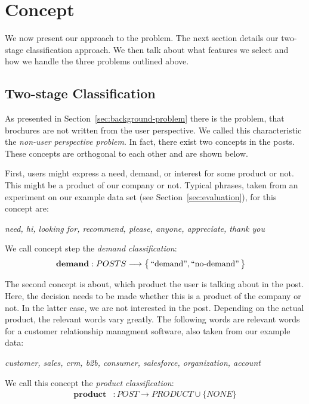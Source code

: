 \section{Concept}
\label{sec:concept}
We now present our approach to the \nto problem.
The next section details our two-stage classification approach.
We then talk about what features we select and how we handle the three problems outlined above.

\subsection{Two-stage Classification}
As presented in Section~\ref{sec:background-problem} there is the problem, that brochures are not written from the user perspective.
We called this characteristic the \emph{non-user perspective problem}.
In fact, there exist two concepts in the posts.
These concepts are orthogonal to each other and are shown below.

First, users might express a need, demand, or interest for some product or not.
This might be a product of our company or not.
Typical phrases, taken from an experiment on our example data set (see Section~\ref{sec:evaluation}), for this concept are:
\begin{center}
	\textit{need, hi, looking for, recommend, please, anyone, appreciate, thank you}
\end{center}
We call concept step the \emph{demand classification}:
\begin{align*}
	\mathbf{demand}&: POSTS \longrightarrow \big\{ \operatorname{``demand''}, \operatorname{``no-demand''} \big\}
\end{align*}

The second concept is about, which product the user is talking about in the post.
Here, the decision needs to be made whether this is a product of the company or not.
In the latter case, we are not interested in the post.
Depending on the actual product, the relevant words vary greatly.
The following words are relevant words for a customer relationship managment software, also taken from our example data:
\begin{center}
	\textit{customer, sales, crm, b2b, consumer, salesforce, organization, account}
\end{center}

We call this concept the \emph{product classification}:
\begin{align*}
	\mathbf{product}&: POST \longrightarrow  PRODUCT \cup \big\{ NONE \big\}
\end{align*}

